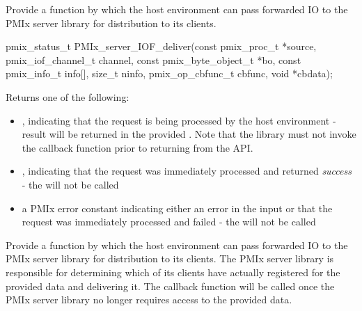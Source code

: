 Provide a function by which the host environment can pass forwarded \ac{IO} to the \ac{PMIx} server library for distribution to its clients.

\format

\cspecificstart
\begin{codepar}
pmix_status_t
PMIx_server_IOF_deliver(const pmix_proc_t *source,
                        pmix_iof_channel_t channel,
                        const pmix_byte_object_t *bo,
                        const pmix_info_t info[], size_t ninfo,
                        pmix_op_cbfunc_t cbfunc, void *cbdata);
\end{codepar}
\cspecificend

\begin{arglist}
\end{arglist}

Returns one of the following:

\begin{itemize}
    \item {}, indicating that the request is being processed by the host environment - result will be returned in the provided . Note that the library must not invoke the callback function prior to returning from the \ac{API}.
    \item {}, indicating that the request was immediately processed and returned \textit{success} - the  will not be called
    \item a PMIx error constant indicating either an error in the input or that the request was immediately processed and failed - the  will not be called
\end{itemize}

\descr

Provide a function by which the host environment can pass forwarded \ac{IO} to the \ac{PMIx} server library for distribution to its clients. The \ac{PMIx} server library is responsible for determining which of its clients have actually registered for the provided data and delivering it. The  callback function will be called once the \ac{PMIx} server library no longer requires access to the provided data.

